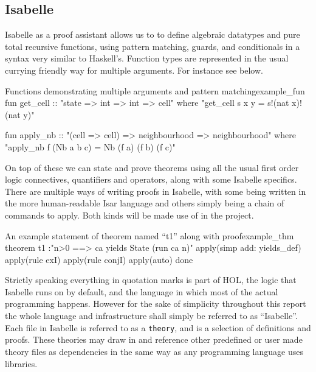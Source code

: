 \subsection{Isabelle}

Isabelle as a proof assistant allows us to to define algebraic datatypes and pure total recursive functions,
using pattern matching, guards, and conditionals in a syntax very similar to Haskell's.
Function types are represented in the usual currying friendly way for multiple arguments.
For instance see  below.

\begin{myminted}{Functions demonstrating multiple arguments and pattern matching}{example_fun}
    fun get_cell :: "state => int => int => cell" where
    "get_cell s x y = s!(nat x)!(nat y)"

    fun apply_nb :: "(cell => cell) => neighbourhood => neighbourhood" where
    "apply_nb f (Nb a b c) = Nb (f a) (f b) (f c)"
\end{myminted}

On top of these we can state and prove theorems using all the usual first order logic connectives, quantifiers and operators,
along with some Isabelle specifics.
There are multiple ways of writing proofs in Isabelle,
with some being written in the more human-readable Isar language
and others simply being a chain of commands to apply.
Both kinds will be made use of in the project.

\begin{myminted}{An example statement of theorem named ``t1'' along with proof}{example_thm}
    theorem t1 :"n>0 ==> ca yields State (run ca n)"
      apply(simp add: yields_def)
      apply(rule exI)
      apply(rule conjI)
      apply(auto)
      done
\end{myminted}

Strictly speaking everything in quotation marks is part of HOL,
the logic that Isabelle runs on by default,
and the language in which most of the actual programming happens.
However for the sake of simplicity throughout this report the whole language and infrastructure shall simply be referred to as ``Isabelle''.
Each file in Isabelle is referred to as a \texttt{theory},
and is a selection of definitions and proofs.
These theories may draw in and reference other predefined or user made theory files as dependencies in the same way as any programming language uses libraries.
